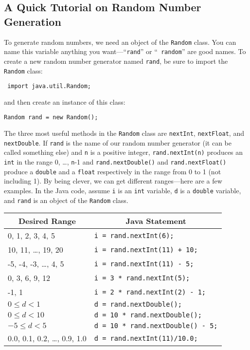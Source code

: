 \vspace{-0.05in}
\subsection*{A Quick Tutorial on Random Number Generation}
\vspace{-0.05in}
To generate random numbers, we need an object of the {\tt Random} class.
You can name this variable anything you want---``{\tt rand}'' or ``{\tt
random}'' are good names. To create a new random number generator
named {\tt rand}, be sure to import the {\tt Random} class:

\vspace{-0.1in}
\begin{center}
\verb$ import java.util.Random;$
\end{center}
\vspace{-0.1in}

and then create an instance of this class:

\vspace{-0.1in}
\begin{center}
\verb$Random rand = new Random();$
\end{center}
\vspace{-0.1in}

The three most useful methods in the {\tt Random} class are {\tt nextInt}, {\tt nextFloat}, and {\tt nextDouble}. If
{\tt rand} is the name of our random number generator (it can be called something else) and {\tt n} is a positive
integer, {\tt rand.nextInt(n)} produces an {\tt int} in the range 0, \ldots, {\tt n}-1 and {\tt rand.nextDouble()} and
{\tt rand.nextFloat()} produce a {\tt double} and a {\tt float} respectively in the range from 0 to 1 (not including 1).
By being clever, we can get different ranges---here are a few examples. In the Java code, assume {\tt i} is an {\tt int}
variable, {\tt d} is a {\tt double} variable, and {\tt rand} is an object of the {\tt Random} class.

\begin{center}
\begin{tabular}{p{2.5in}p{3.5in}}
\multicolumn{1}{c}{\bf Desired Range} & \multicolumn{1}{c}{\bf Java
Statement}\\\hline
0, 1, 2, 3, 4, 5 & \verb$i = rand.nextInt(6);$\\
10, 11, \ldots, 19, 20 & \verb$i = rand.nextInt(11) + 10;$\\
-5, -4, -3, \ldots, 4, 5 & \verb$i = rand.nextInt(11) - 5;$\\
0, 3, 6, 9, 12 & \verb$i = 3 * rand.nextInt(5);$\\
-1, 1 & \verb$i = 2 * rand.nextInt(2) - 1;$\\
$0 \leq d < 1$ & \verb$d = rand.nextDouble();$\\
$0 \leq d < 10$ & \verb$d = 10 * rand.nextDouble();$\\
$-5 \leq d < 5$ & \verb$d = 10 * rand.nextDouble() - 5;$\\
0.0, 0.1, 0.2, \ldots, 0.9, 1.0 & \verb$d = rand.nextInt(11)/10.0;$
\end{tabular}
\end{center}


